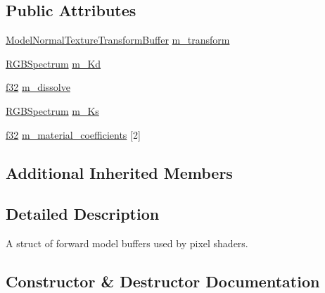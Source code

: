 \subsection*{Public Attributes}
\begin{DoxyCompactItemize}
\item 
\hyperlink{structmage_1_1_model_normal_texture_transform_buffer}{Model\+Normal\+Texture\+Transform\+Buffer} \hyperlink{structmage_1_1_forward_model_buffer_a27b3f08d5ff639d8dcc3878978a2d212}{m\+\_\+transform}
\item 
\hyperlink{structmage_1_1_r_g_b_spectrum}{R\+G\+B\+Spectrum} \hyperlink{structmage_1_1_forward_model_buffer_aed51188d71fc18b4e6f62f0834d6aca9}{m\+\_\+\+Kd}
\item 
\hyperlink{namespacemage_a6a44ad388483959dc4dff9f2aef91431}{f32} \hyperlink{structmage_1_1_forward_model_buffer_a66aac36b793d38cff5dede6a683ff6a5}{m\+\_\+dissolve}
\item 
\hyperlink{structmage_1_1_r_g_b_spectrum}{R\+G\+B\+Spectrum} \hyperlink{structmage_1_1_forward_model_buffer_a8a5ccfc750ad2142c97d82545196b1e8}{m\+\_\+\+Ks}
\item 
\hyperlink{namespacemage_a6a44ad388483959dc4dff9f2aef91431}{f32} \hyperlink{structmage_1_1_forward_model_buffer_a6acd1050a724016b667529ea3b9de9b8}{m\+\_\+material\+\_\+coefficients} \mbox{[}2\mbox{]}
\end{DoxyCompactItemize}
\subsection*{Additional Inherited Members}


\subsection{Detailed Description}
A struct of forward model buffers used by pixel shaders. 

\subsection{Constructor \& Destructor Documentation}
\hypertarget{structmage_1_1_forward_model_buffer_ae9a1629205067c541dcc2d3f1964d8e2}{}\label{structmage_1_1_forward_model_buffer_ae9a1629205067c541dcc2d3f1964d8e2} 
